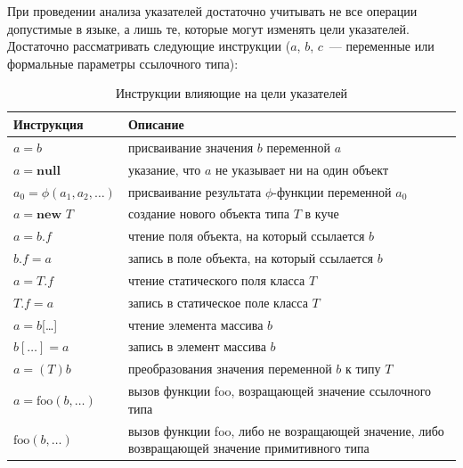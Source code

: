 \documentclass[14pt,titlepage]{extarticle}
\newcommand{\NEW}{\textbf{new }}
\newcommand{\NULL}{\textbf{null }}
\begin{document}
      При проведении анализа указателей достаточно учитывать не все операции
      допустимые в языке, а лишь те, которые могут изменять цели указателей.
      Достаточно рассматривать следующие инструкции ($a$, $b$, $c$~---
      переменные или формальные параметры ссылочного типа):
      \begin{table}
        \begin{tabular}{|l|p{120mm}|}\hline
          \textbf{Инструкция} & \textbf{Описание}\\ \hline

          $a = b$
          & присваивание значения $b$ переменной $a$ \\ \hline

          $a = \NULL$
          & указание, что $a$ не указывает ни на один объект \\ \hline

          $a_0 = \phi(a_1, a_2, \ldots)$
          & присваивание результата $\phi$-функции переменной $a_0$ \\ \hline

          $a = \NEW T$
          & создание нового объекта типа $T$ в куче \\ \hline

          $a = b.f$
          & чтение поля объекта, на который ссылается $b$ \\ \hline

          $b.f = a$
          & запись в поле объекта, на который ссылается $b$ \\ \hline

          $a = T.f$
          & чтение статического поля класса $T$ \\ \hline

          $T.f = a$
          & запись в статическое поле класса $T$ \\ \hline

          $a = b$[\ldots]
          & чтение элемента массива $b$ \\ \hline

          $b[\ldots] = a$
          & запись в элемент массива $b$ \\ \hline

          $a = (T)b$
          & преобразования значения переменной $b$ к типу $T$ \\ \hline

          $a = \textrm{foo}(b, \ldots)$
          & вызов функции foo, возращающей значение ссылочного типа \\ \hline

          $\textrm{foo}(b, \ldots)$
          & вызов функции foo, либо не возращающей значение, либо возвращающей значение примитивного типа \\ \hline
        \end{tabular}
        \caption{Инструкции влияющие на цели указателей}
        \label{tabular:instructions}
      \end{table}
\end{document}
